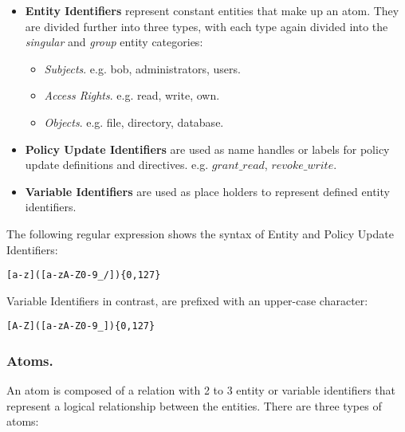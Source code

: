 \documentclass[11pt]{llncs}
\begin{document}
        \begin{itemize}
          \item
            {\bf Entity Identifiers} represent constant entities that make
            up an atom. They are divided further into three types, with each
            type again divided into the {\em singular} and {\em group} entity
            categories:
 
            \begin{itemize}
              \item
                {\em Subjects}. e.g. bob, administrators, users.
              \item
                {\em Access Rights}. e.g. read, write, own.
              \item
                {\em Objects}. e.g. file, directory, database.
            \end{itemize}
          \vspace{1mm}
          \item
            {\bf Policy Update Identifiers} are used as name handles or labels
            for policy update definitions and directives. e.g. $grant\_read$,
            $revoke\_write$.
 
          \vspace{1mm}
          \item
            {\bf Variable Identifiers} are used as place holders to represent
            defined entity identifiers.
        \end{itemize}
 
        The following regular expression shows the syntax of Entity and
        Policy Update Identifiers:
 
        \begin{verbatim}[a-z]([a-zA-Z0-9_/]){0,127}\end{verbatim}
 
        Variable Identifiers in contrast, are prefixed with an upper-case
        character:
 
        \begin{verbatim}[A-Z]([a-zA-Z0-9_]){0,127}\end{verbatim}

      \subsubsection{Atoms.}

        An atom is composed of a relation with 2 to 3 entity or variable
        identifiers that represent a logical relationship between the entities.
        There are three types of atoms:
\end{document}
